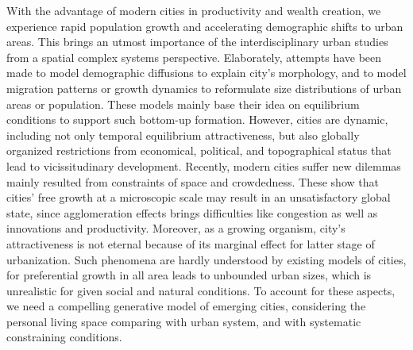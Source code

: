 \documentclass[reprint,unsortedaddress,amsmath,amssymb,aps,prl,showkeys]{revtex4-2}
\begin{document}
With the advantage of modern cities in productivity and wealth creation\cite{Glaeser592,bettencourt2010unified}, we experience rapid population growth and accelerating demographic shifts to urban areas. This brings an utmost importance of the interdisciplinary urban studies from a spatial complex systems perspective\cite{batty2013new,batty2007cities,batty2008size,portugali2011complexity,angel2005dynamics,boeing2017structure,PhysRevLett.79.523,bettencourt2013origins}. Elaborately, attempts have been made to model demographic diffusions to explain city's morphology, and to model migration patterns or growth dynamics to reformulate size distributions of urban areas or population. These models mainly base their idea on equilibrium conditions to support such bottom-up formation. However, cities are dynamic, including not only temporal equilibrium attractiveness, but also globally organized restrictions from economical, political, and topographical status that lead to vicissitudinary development. Recently, modern cities suffer new dilemmas mainly resulted from constraints of space and crowdedness\cite{haase2014conceptualizing,martinez2012shrinking, PhysRevLett.120.108701,manoli2019magnitude}. These show that cities' free growth at a microscopic scale may result in an unsatisfactory global state, since agglomeration effects\cite{batty2013new} brings difficulties like congestion as well as innovations and productivity. Moreover, as a growing organism, city's attractiveness is not eternal because of its marginal effect for latter stage of urbanization\cite{atkinson2012urban,girardin2009quantifying}. Such phenomena are hardly understood by existing models of cities, for preferential growth in all area leads to unbounded urban sizes, which is unrealistic for given social and natural conditions. To account for these aspects, we need a compelling generative model of emerging cities, considering the personal living space comparing with urban system, and with systematic constraining conditions. 

\end{document}
